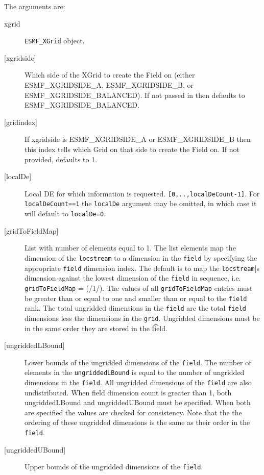    The arguments are:
   \begin{description}
   \item [xgrid]
          {\tt ESMF\_XGrid} object.
   \item [{[xgridside]}]
         Which side of the XGrid to create the Field on (either ESMF\_XGRIDSIDE\_A,
         ESMF\_XGRIDSIDE\_B, or ESMF\_XGRIDSIDE\_BALANCED). If not passed in then
         defaults to ESMF\_XGRIDSIDE\_BALANCED.
   \item [{[gridindex]}]
         If xgridside is ESMF\_XGRIDSIDE\_A or ESMF\_XGRIDSIDE\_B then this index tells which Grid on
         that side to create the Field on. If not provided, defaults to 1.
   \item [{[localDe]}]
         Local DE for which information is requested. {\tt [0,..,localDeCount-1]}.
         For {\tt localDeCount==1} the {\tt localDe} argument may be omitted,
         in which case it will default to {\tt localDe=0}.
   \item [{[gridToFieldMap]}]
         List with number of elements equal to 1.
         The list elements map the dimension
         of the {\tt locstream} to a dimension in the {\tt field} by
         specifying the appropriate {\tt field} dimension index. The default is to
         map the {\tt locstream}|s dimension against the lowest dimension of
         the {\tt field} in sequence, i.e. {\tt gridToFieldMap} = (/1/).
         The values of all {\tt gridToFieldMap} entries must be greater than or equal
         to one and smaller than or equal to the {\tt field} rank.
         The total ungridded dimensions in the {\tt field}
         are the total {\tt field} dimensions less
         the dimensions in
         the {\tt grid}.  Ungridded dimensions must be in the same order they are
         stored in the {\t field}.  
   \item [{[ungriddedLBound]}]
         Lower bounds of the ungridded dimensions of the {\tt field}.
         The number of elements in the {\tt ungriddedLBound} is equal to the number of ungridded
         dimensions in the {\tt field}.  All ungridded dimensions of the
         {\tt field} are also undistributed. When field dimension count is
         greater than 1, both ungriddedLBound and ungriddedUBound
         must be specified. When both are specified the values are checked
         for consistency.  Note that the the ordering of
         these ungridded dimensions is the same as their order in the {\tt field}.
   \item [{[ungriddedUBound]}]
         Upper bounds of the ungridded dimensions of the {\tt field}.

\end{description}
